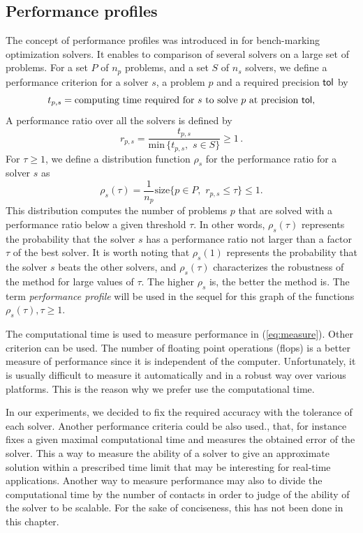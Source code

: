 \subsection{Performance profiles}

The concept of performance profiles was introduced in \citep{Dolan.More_MP2002} for bench-marking optimization solvers. It enables to comparison of several solvers on a large set of problems. For a set $P$ of $n_p$ problems, and a set $S$ of $n_s$ solvers, we define a performance criterion for a solver $s$, a problem $p$ and a required precision $\sf tol$ by
\begin{equation}
  \label{eq:measure}
 t_{p,s} = \text{computing time required for}\, \,  s\, \,  \text{to solve}\, \,  p \, \,  \text{at precision } \sf tol, 
\end{equation}
A performance ratio over all the solvers is defined by
\begin{equation}
 r_{p, s} = \frac{t_{p,s}}{\text{min}\, \{t_{p,s}, \, \, s \in S\}} \geq 1 \, .
\end{equation}
For $\tau \geq 1$, we define a  distribution function $\rho_s$ for the performance ratio for a solver $s$ as
\begin{equation}
 \rho_s(\tau) = \frac{1}{n_p} \text{size} \{p \in P, \, \, r_{p, s} \leq \tau\} \leq 1.
\end{equation}
This distribution computes the number of problems $p$ that are solved with a performance ratio below a given threshold $\tau$. In other words, $\rho_s(\tau)$ represents the probability that the solver $s$ has a performance ratio not larger than a factor $\tau$ of the best solver. It is worth noting that $\rho_s(1)$ represents the probability that the solver $s$ beats the other solvers, and $\rho_s(\tau)$ characterizes the robustness of the method for large values of $\tau$.
The higher $\rho_s$ is, the better the method is. The term \textit{performance profile} will be used in the sequel for this graph of the functions $\rho_s(\tau), \tau \geq 1$.

The computational time is used to measure performance in (\ref{eq:measure}).  Other criterion can be used. The number of floating point operations (flops) is a better measure of performance since it is independent of the computer. Unfortunately, it is usually difficult to measure it automatically and in a robust way over various platforms. This is the reason why we prefer use the computational time.

In our experiments, we decided to fix the required accuracy with the tolerance of each solver. Another performance criteria could be also used., that, for instance  fixes a given maximal computational time and measures the obtained error of the solver. This a way to measure the ability of a solver to give an approximate solution within a prescribed   time limit that may be interesting for real-time applications. Another way to measure performance may also to divide the computational time by the number of contacts in order to judge of the ability of the solver to be scalable. For the sake of conciseness, this has not been done in this chapter.

